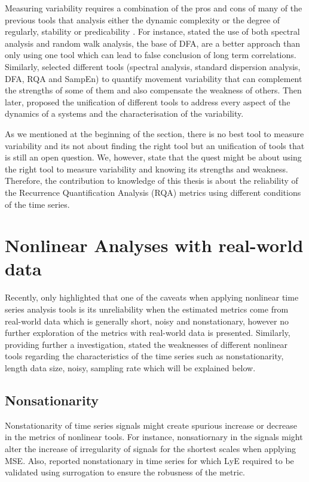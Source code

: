 Measuring variability requires a combination of the pros and cons of many 
of the previous tools that analysis either the dynamic complexity or the degree 
of regularly, stability or predicability \citep{goldberger2002b, harbourne2009, stergiou2011}.
For instance, \cite{rangarajan2000} stated the use of both spectral analysis 
and random walk analysis, the base of DFA, are a better approach than only using one tool 
which can lead to false conclusion of long term correlations.
Similarly, \cite{wijnants2009} selected different tools 
(spectral analysis, standard dispersion analysis, DFA, RQA and SampEn) 
to quantify movement variability that can complement 
the strengths of some of them and also compensate the weakness of others.
Then later, \cite{caballero2014} proposed the unification of different tools to 
address every aspect of the dynamics of a systems and the characterisation of 
the variability. 

As we mentioned at the beginning of the section, there is no best tool to measure 
variability and its not about finding the right tool but an unification of tools
that is still an open question. We, however, state that the quest might be about using 
the right tool to measure variability and knowing its strengths and weakness.
Therefore, the contribution to knowledge of this thesis is about the 
reliability of the  Recurrence Quantification Analysis (RQA) metrics using 
different conditions of the time series.



\section{Nonlinear Analyses with real-world data}

Recently, \cite{huffaker2017} only highlighted that one of the caveats 
when applying nonlinear time series analysis tools is its unreliability 
when the estimated metrics come from real-world data which is generally 
short, noisy and nonstationary, however no further exploration of the metrics
with real-world data is presented.
Similarly, providing further a investigation, \cite{caballero2014} 
stated the weaknesses of different nonlinear tools regarding the 
characteristics of the time series such as nonstationarity, length data size, 
noisy, sampling rate which will be explained below.





\subsection{Nonsationarity}
Nonstationarity of time series signals might create
spurious increase or decrease in the metrics of nonlinear tools. 
For instance, \cite{costa2007} nonsatiornary in the signals might alter 
the increase of irregularity of signals for the shortest scales when 
applying MSE. 
Also, \cite{dingwell2000} reported nonstationary in time series 
for which LyE \cite{wolf1985} required to be validated using surrogation 
to ensure the robusness of the metric.

